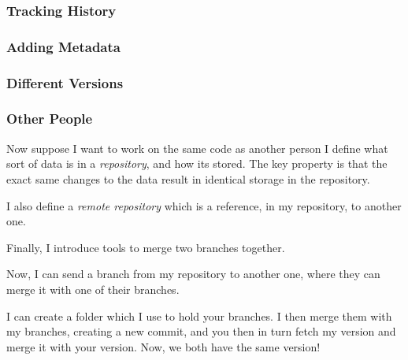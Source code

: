 \documentclass{beamer}
\begin{document}
\begin{frame}[fragile]
\frametitle{Tracking History}
\end{frame}

\begin{frame}[fragile]
\frametitle{Adding Metadata}

\end{frame}

\begin{frame}[fragile]
\frametitle{Different Versions}
\end{frame}

\begin{frame}[fragile]
\frametitle{Other People}
 Now suppose I want to work on the same code as another person
% 
I define what sort of data is in a \emph{repository}, and how its stored. The key property is that the exact same changes to the data result in identical storage in the repository. 

I also define a \emph{remote repository} which is a reference, in my repository, to another one.

Finally, I introduce tools to merge two branches together.

Now, I can send a branch from my repository to another one, where they can merge it with one of their branches.

I can create a folder which I use to hold your branches. I then merge them with my branches, creating a new commit, and you then in turn fetch my version and merge it with your version. Now, we both have the same version!


\end{frame}
\end{document}
